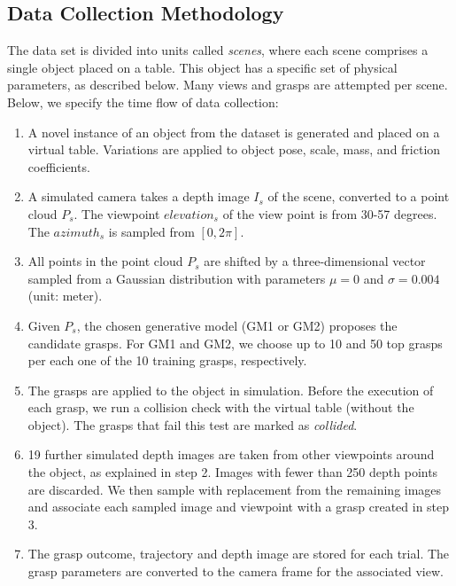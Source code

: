 \subsection{Data Collection Methodology}
\label{subsection:dataCollection}

The data set is divided into units called \textit{scenes}, where each scene comprises a single object placed on a table. This object has a specific set of physical parameters, as described below. Many views and grasps are attempted per scene. Below, we specify the time flow of data collection:

\begin{enumerate}
\item A novel instance of an object from the dataset is generated and placed on a virtual table. Variations are applied to object pose, scale, mass, and friction coefficients.
\item A simulated camera takes a depth image $I_s$ of the scene, converted to a point cloud $P_s$. The viewpoint ${elevation}_s$ of the view point is from 30-57 degrees. The ${azimuth}_s$ is sampled from $[0, 2\pi]$. 
\item All points in the point cloud $P_s$ are shifted by a three-dimensional vector sampled from a Gaussian distribution with parameters $\mu=0$ and $\sigma = 0.004$ (unit: meter).
\item Given $P_s$, the chosen generative model (GM1 or GM2) proposes the candidate grasps. For GM1 and GM2, we choose up to 10 and 50 top grasps per each one of the 10 training grasps, respectively.
\item The grasps are applied to the object in simulation. Before the execution of each grasp, we run a collision check with the virtual table (without the object). The grasps that fail this test are marked as \textit{collided}.
\item 19 further simulated depth images are taken from other viewpoints around the object, as explained in step 2. Images with fewer than 250 depth points are discarded. We then sample with replacement from the remaining images and associate each sampled image and viewpoint with a grasp created in step 3.
\item The grasp outcome, trajectory and depth image are stored for each trial. The grasp parameters are converted to the camera frame for the associated view.
\end{enumerate}

